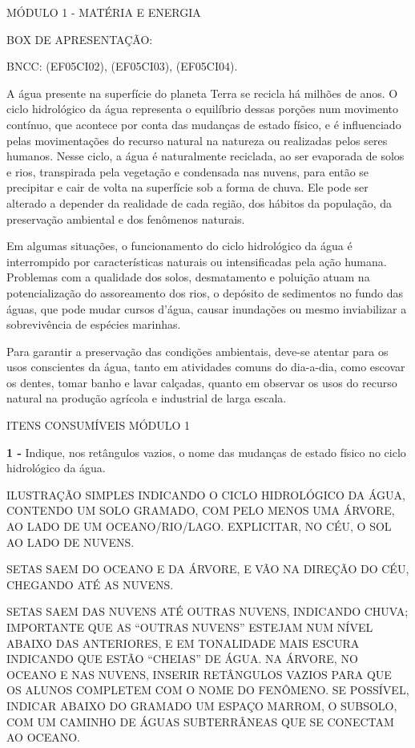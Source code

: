\protect\hypertarget{_97bzdg6awijd}{}{}MÓDULO 1 - MATÉRIA E ENERGIA

BOX DE APRESENTAÇÃO:

BNCC: (EF05CI02), (EF05CI03), (EF05CI04).

A água presente na superfície do planeta Terra se recicla há milhões de
anos. O ciclo hidrológico da água representa o equilíbrio dessas porções
num movimento contínuo, que acontece por conta das mudanças de estado
físico, e é influenciado pelas movimentações do recurso natural na
natureza ou realizadas pelos seres humanos. Nesse ciclo, a água é
naturalmente reciclada, ao ser evaporada de solos e rios, transpirada
pela vegetação e condensada nas nuvens, para então se precipitar e cair
de volta na superfície sob a forma de chuva. Ele pode ser alterado a
depender da realidade de cada região, dos hábitos da população, da
preservação ambiental e dos fenômenos naturais.

Em algumas situações, o funcionamento do ciclo hidrológico da água é
interrompido por características naturais ou intensificadas pela ação
humana. Problemas com a qualidade dos solos, desmatamento e poluição
atuam na potencialização do assoreamento dos rios, o depósito de
sedimentos no fundo das águas, que pode mudar cursos d'água, causar
inundações ou mesmo inviabilizar a sobrevivência de espécies marinhas.

Para garantir a preservação das condições ambientais, deve-se atentar
para os usos conscientes da água, tanto em atividades comuns do
dia-a-dia, como escovar os dentes, tomar banho e lavar calçadas, quanto
em observar os usos do recurso natural na produção agrícola e industrial
de larga escala.

\protect\hypertarget{_i6y978qgte38}{}{}ITENS CONSUMÍVEIS MÓDULO 1

\textbf{1 -} Indique, nos retângulos vazios, o nome das mudanças de
estado físico no ciclo hidrológico da água.

ILUSTRAÇÃO SIMPLES INDICANDO O CICLO HIDROLÓGICO DA ÁGUA, CONTENDO UM
SOLO GRAMADO, COM PELO MENOS UMA ÁRVORE, AO LADO DE UM OCEANO/RIO/LAGO.
EXPLICITAR, NO CÉU, O SOL AO LADO DE NUVENS.

SETAS SAEM DO OCEANO E DA ÁRVORE, E VÃO NA DIREÇÃO DO CÉU, CHEGANDO ATÉ
AS NUVENS.

SETAS SAEM DAS NUVENS ATÉ OUTRAS NUVENS, INDICANDO CHUVA; IMPORTANTE QUE
AS ``OUTRAS NUVENS'' ESTEJAM NUM NÍVEL ABAIXO DAS ANTERIORES, E EM
TONALIDADE MAIS ESCURA INDICANDO QUE ESTÃO ``CHEIAS'' DE ÁGUA. NA
ÁRVORE, NO OCEANO E NAS NUVENS, INSERIR RETÂNGULOS VAZIOS PARA QUE OS
ALUNOS COMPLETEM COM O NOME DO FENÔMENO. SE POSSÍVEL, INDICAR ABAIXO DO
GRAMADO UM ESPAÇO MARROM, O SUBSOLO, COM UM CAMINHO DE ÁGUAS
SUBTERRÂNEAS QUE SE CONECTAM AO OCEANO.

